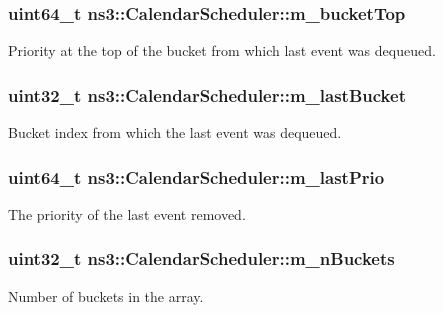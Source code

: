 \subsubsection[{\texorpdfstring{m\+\_\+bucket\+Top}{m_bucketTop}}]{\setlength{\rightskip}{0pt plus 5cm}uint64\+\_\+t ns3\+::\+Calendar\+Scheduler\+::m\+\_\+bucket\+Top\hspace{0.3cm}{\ttfamily [private]}}\hypertarget{classns3_1_1CalendarScheduler_a8a8746e4fc94345c5584629b78b25549}{}\label{classns3_1_1CalendarScheduler_a8a8746e4fc94345c5584629b78b25549}
Priority at the top of the bucket from which last event was dequeued. 
\subsubsection[{\texorpdfstring{m\+\_\+last\+Bucket}{m_lastBucket}}]{\setlength{\rightskip}{0pt plus 5cm}uint32\+\_\+t ns3\+::\+Calendar\+Scheduler\+::m\+\_\+last\+Bucket\hspace{0.3cm}{\ttfamily [private]}}\hypertarget{classns3_1_1CalendarScheduler_aac53aae4bda7758ba73e45bfe775fec0}{}\label{classns3_1_1CalendarScheduler_aac53aae4bda7758ba73e45bfe775fec0}
Bucket index from which the last event was dequeued. 
\subsubsection[{\texorpdfstring{m\+\_\+last\+Prio}{m_lastPrio}}]{\setlength{\rightskip}{0pt plus 5cm}uint64\+\_\+t ns3\+::\+Calendar\+Scheduler\+::m\+\_\+last\+Prio\hspace{0.3cm}{\ttfamily [private]}}\hypertarget{classns3_1_1CalendarScheduler_ac0e4ff83ceeb795f92af7a52d48ec41b}{}\label{classns3_1_1CalendarScheduler_ac0e4ff83ceeb795f92af7a52d48ec41b}
The priority of the last event removed. 
\subsubsection[{\texorpdfstring{m\+\_\+n\+Buckets}{m_nBuckets}}]{\setlength{\rightskip}{0pt plus 5cm}uint32\+\_\+t ns3\+::\+Calendar\+Scheduler\+::m\+\_\+n\+Buckets\hspace{0.3cm}{\ttfamily [private]}}\hypertarget{classns3_1_1CalendarScheduler_a0bbeaf47c899cb8f2cf9e17387014f3f}{}\label{classns3_1_1CalendarScheduler_a0bbeaf47c899cb8f2cf9e17387014f3f}
Number of buckets in the array. 
